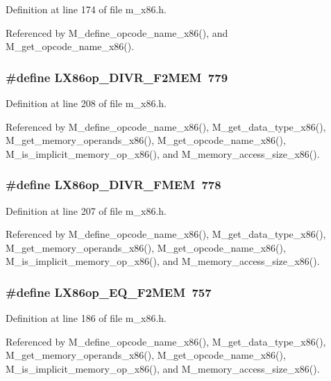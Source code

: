 Definition at line 174 of file m\_\-x86.h.

Referenced by M\_\-define\_\-opcode\_\-name\_\-x86(), and M\_\-get\_\-opcode\_\-name\_\-x86().
\subsubsection{\setlength{\rightskip}{0pt plus 5cm}\#define LX86op\_\-DIVR\_\-F2MEM~779}\label{m__x86_8h_858afe804fbf12942bd284ef626e2a0e}




Definition at line 208 of file m\_\-x86.h.

Referenced by M\_\-define\_\-opcode\_\-name\_\-x86(), M\_\-get\_\-data\_\-type\_\-x86(), M\_\-get\_\-memory\_\-operands\_\-x86(), M\_\-get\_\-opcode\_\-name\_\-x86(), M\_\-is\_\-implicit\_\-memory\_\-op\_\-x86(), and M\_\-memory\_\-access\_\-size\_\-x86().
\subsubsection{\setlength{\rightskip}{0pt plus 5cm}\#define LX86op\_\-DIVR\_\-FMEM~778}\label{m__x86_8h_ea81d923329e8268dd501edc9b3f95d9}




Definition at line 207 of file m\_\-x86.h.

Referenced by M\_\-define\_\-opcode\_\-name\_\-x86(), M\_\-get\_\-data\_\-type\_\-x86(), M\_\-get\_\-memory\_\-operands\_\-x86(), M\_\-get\_\-opcode\_\-name\_\-x86(), M\_\-is\_\-implicit\_\-memory\_\-op\_\-x86(), and M\_\-memory\_\-access\_\-size\_\-x86().
\subsubsection{\setlength{\rightskip}{0pt plus 5cm}\#define LX86op\_\-EQ\_\-F2MEM~757}\label{m__x86_8h_6def99e9a2cf23aa24eb0992013dda26}




Definition at line 186 of file m\_\-x86.h.

Referenced by M\_\-define\_\-opcode\_\-name\_\-x86(), M\_\-get\_\-data\_\-type\_\-x86(), M\_\-get\_\-memory\_\-operands\_\-x86(), M\_\-get\_\-opcode\_\-name\_\-x86(), M\_\-is\_\-implicit\_\-memory\_\-op\_\-x86(), and M\_\-memory\_\-access\_\-size\_\-x86().
